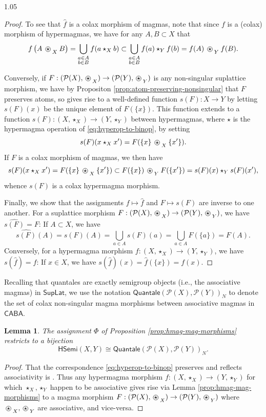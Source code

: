 \documentclass[reqno]{amsart}
\newcommand{\ostar}{%
  \mathbin{%
    \tikz[baseline=(s.base)]{
      \node (s) at (0,0) {$\star$};
      \draw[line width=0.4pt] (s.center) circle[radius=0.82ex];
    }%
  }%
}
\newcommand{\pow}{\mathcal{P}}
\newcommand{\cat}{\mathsf}
\numberwithin{equation}{section}
\theoremstyle{plain}
\newtheorem{lemma}[equation]{Lemma}
\theoremstyle{definition}
\begin{document}
\begin{spacing}{1.05}
\begin{proof}
    To see that $\hat{f}$ is a colax morphism of magmas, note that since $f$ is a (colax) morphism of hypermagmas, we have for any $A,B \subset X$ that $$ f\left( A \ostar_X B \right) = \bigcup_{\substack{a \in A\\ b \in B}} f(a \star_X b) \subset \bigcup_{\substack{a \in A\\ b \in B}} f(a) \star_Y f(b) = f(A) \ostar_Y f(B).$$ 

    Conversely, if ${F : (\pow(X),\ostar_X) \to (\pow(Y), \ostar_Y)}$ is any non-singular suplattice morphism, we have by Propositon \ref{prop:atom-preserving-nonsingular} that $F$ preserves atoms, so gives rise to a well-defined function $s(F): X \to Y$ by letting $s(F)(x)$ be the unique element of $F(\{x\})$. This function extends to a function $s(F): (X, \star_X) \to (Y, \star_Y)$ between hypermagmas, where $\star$ is the hypermagma operation of \ref{eq:hyperop-to-binop}, by setting $$s(F)(x \star_X x') = F(\{x\} \ostar_X \{x'\}).$$ If $F$ is a colax morphism of magmas, we then have $$s(F)(x \star_X x') = F(\{x\} \ostar_X \{x'\}) \subset F(\{x\}) \ostar_Y F(\{x'\}) = s(F)(x) \star_Y s(F)(x'),$$ whence $s(F)$ is a colax hypermagma morphism.

    Finally, we show that the assignments $f \mapsto \hat{f}$ and $F \mapsto s(F)$ are inverse to one another. For a suplattice morphism ${F : (\pow(X),\ostar_X) \to (\pow(Y), \ostar_Y)}$, we have $\widehat{s(F)} = F$: If $A \subset X$, we have $$\widehat{s(F)}(A) = s(F)(A) = \bigcup_{a \in A} s(F)(a) = \bigcup_{a \in A} F(\{a\}) = F(A).$$ Conversely, for a hypermagma morphism $f : (X, \star_X) \to (Y, \star_Y)$, we have $s(\hat{f}) = f$: If $x \in X$, we have $s(\hat{f})(x) = \hat{f}(\{x\}) = f(x)$.
\end{proof}

Recalling that quantales are exactly semigroup objects (i.e., the associative magmas) in $\cat{SupLat}$, we use the notation $\cat{Quantale}(\pow(X),\pow(Y))_N$ to denote the set of colax non-singular magma morphisms between associative magmas in $\cat{CABA}$.

\begin{lemma} \label{lem:hsemi-semi-morphisms}
    The assignment $\Phi$ of Proposition \ref{prop:hmag-mag-morphisms} restricts to a bijection $$ \cat{HSemi}(X,Y) \cong \cat{Quantale}(\pow(X),\pow(Y))_N. $$
\end{lemma}

\begin{proof}
    That the correspondence \ref{eq:hyperop-to-binop} preserves and reflects associativity is \cite[N.8]{Dudzik_2016}. Thus any hypermagma morphism $f : (X, \star_X) \to (Y, \star_Y)$ for which $\star_X,\star_Y$ happen to be associative gives rise via Lemma \ref{prop:hmag-mag-morphisms} to a magma morphism ${F : (\pow(X),\ostar_X) \to (\pow(Y), \ostar_Y)}$ where $\ostar_X,\ostar_Y$ are associative, and vice-versa.
\end{proof}


\end{spacing}
\end{document}
